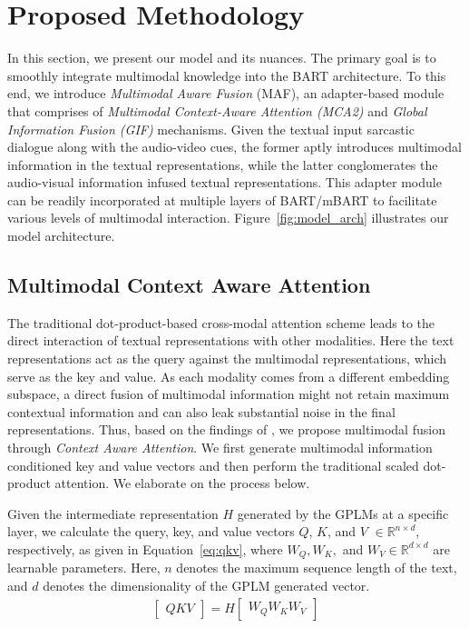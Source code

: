 \documentclass[11pt]{article}
\newcommand{\model}{\textsc{MAF}}
\begin{document}
\section{Proposed Methodology}
In this section, we present our model and its nuances. The primary goal is to smoothly integrate multimodal knowledge into the BART architecture. To this end, we introduce \textit{Multimodal Aware Fusion} (\model), an adapter-based module that comprises of \textit{Multimodal Context-Aware Attention (MCA2)} and \textit{Global Information Fusion (GIF)} mechanisms. Given the textual input sarcastic dialogue along with the audio-video cues, the former aptly introduces multimodal information in the textual representations, while the latter conglomerates the audio-visual information infused textual representations. This adapter module can be readily incorporated at multiple layers of BART/mBART to facilitate various levels of multimodal interaction. Figure~\ref{fig:model_arch} illustrates our model architecture.

\subsection{Multimodal Context Aware Attention}
The traditional dot-product-based cross-modal attention scheme leads to the direct interaction of textual representations with other modalities. Here the text representations act as the query against the multimodal representations, which serve as the key and value. As each modality comes from a different embedding subspace, a direct fusion of multimodal information might not retain maximum contextual information and can also leak substantial noise in the final representations. Thus, based on the findings of \citet{Yang_Li_Wong_Chao_Wang_Tu_2019}, we propose multimodal fusion through \textit{Context Aware Attention}. We first generate multimodal information conditioned key and value vectors and then perform the traditional scaled dot-product attention. We elaborate on the process below.

Given the intermediate representation $H$ generated by the GPLMs at a specific layer, we calculate the query, key, and value vectors $Q$, $K$, and $V$ $\in \mathbb{R}^{n \times d}$, respectively, as given in Equation~\ref{eq:qkv}, where $W_Q, W_K,$ and $W_V \in \mathbb{R}^{d \times d}$ are learnable parameters. Here, $n$ denotes the maximum sequence length of the text, and $d$ denotes the dimensionality of the GPLM generated vector.
\begin{eqnarray}
    \begin{bmatrix}
    Q  K  V
    \end{bmatrix} = H \begin{bmatrix}
    W_Q  W_K  W_V
    \end{bmatrix}
    \label{eq:qkv}
\end{eqnarray}
\end{document}
